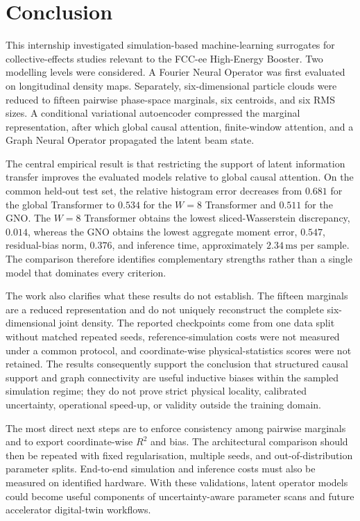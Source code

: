 \section{Conclusion}
\label{sec:conclusion}

This internship investigated simulation-based machine-learning surrogates for collective-effects studies relevant to the FCC-ee High-Energy Booster. Two modelling levels were considered. A Fourier Neural Operator was first evaluated on longitudinal density maps. Separately, six-dimensional particle clouds were reduced to fifteen pairwise phase-space marginals, six centroids, and six RMS sizes. A conditional variational autoencoder compressed the marginal representation, after which global causal attention, finite-window attention, and a Graph Neural Operator propagated the latent beam state.

The central empirical result is that restricting the support of latent information transfer improves the evaluated models relative to global causal attention. On the common held-out test set, the relative histogram error decreases from $0.681$ for the global Transformer to $0.534$ for the $W=8$ Transformer and $0.511$ for the GNO. The $W=8$ Transformer obtains the lowest sliced-Wasserstein discrepancy, $0.014$, whereas the GNO obtains the lowest aggregate moment error, $0.547$, residual-bias norm, $0.376$, and inference time, approximately $2.34\,\mathrm{ms}$ per sample. The comparison therefore identifies complementary strengths rather than a single model that dominates every criterion.

The work also clarifies what these results do not establish. The fifteen marginals are a reduced representation and do not uniquely reconstruct the complete six-dimensional joint density. The reported checkpoints come from one data split without matched repeated seeds, reference-simulation costs were not measured under a common protocol, and coordinate-wise physical-statistics scores were not retained. The results consequently support the conclusion that structured causal support and graph connectivity are useful inductive biases within the sampled simulation regime; they do not prove strict physical locality, calibrated uncertainty, operational speed-up, or validity outside the training domain.

The most direct next steps are to enforce consistency among pairwise marginals and to export coordinate-wise $R^2$ and bias. The architectural comparison should then be repeated with fixed regularisation, multiple seeds, and out-of-distribution parameter splits. End-to-end simulation and inference costs must also be measured on identified hardware. With these validations, latent operator models could become useful components of uncertainty-aware parameter scans and future accelerator digital-twin workflows.

